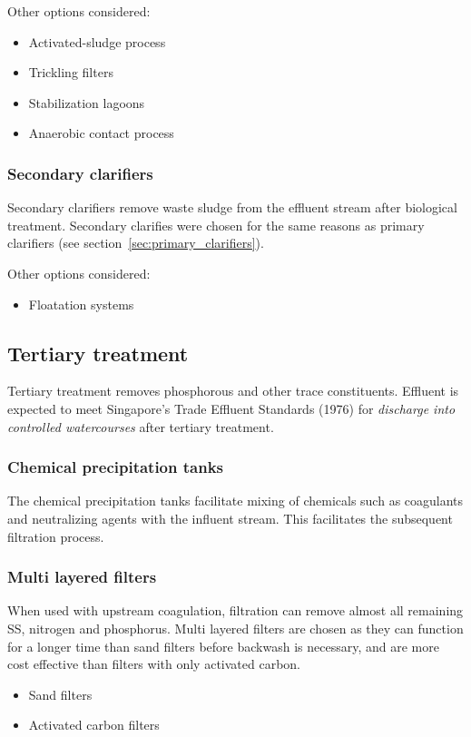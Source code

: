 \documentclass[a4paper,10pt]{article}
\begin{document}
Other options considered:
\begin{itemize}
\item Activated-sludge process
\item Trickling filters
\item Stabilization lagoons
\item Anaerobic contact process
\end{itemize}

\subsubsection{Secondary clarifiers}
Secondary clarifiers remove waste sludge from the effluent stream after biological treatment. 
Secondary clarifies were chosen for the same reasons as primary clarifiers (see section~\ref{sec:primary_clarifiers}).

Other options considered:
\begin{itemize}
\item Floatation systems
\end{itemize}


\subsection{Tertiary treatment}
Tertiary treatment removes phosphorous and other trace constituents. Effluent is expected to meet Singapore's Trade Effluent Standards (1976) for \emph{discharge into controlled watercourses} after tertiary treatment.

\subsubsection{Chemical precipitation tanks}
The chemical precipitation tanks facilitate mixing of chemicals such as coagulants and neutralizing agents with the influent stream. This facilitates the subsequent filtration process.

\subsubsection{Multi layered filters}
When used with upstream coagulation, filtration can remove almost all remaining SS, nitrogen and phosphorus. Multi layered filters are chosen as they can function for a longer time than sand filters before backwash is necessary, and are more cost effective than filters with only activated carbon.

\begin{itemize}
\item Sand filters
\item Activated carbon filters
\end{itemize}
\end{document}
